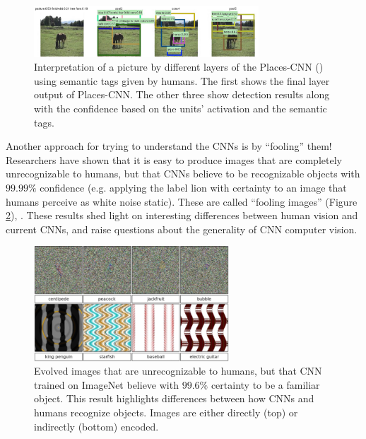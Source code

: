 \begin{figure}[H]
\begin{center}
\includegraphics[width=0.75\textwidth]{fig/cnn_objdet}
\end{center}
\caption{Interpretation of a picture by different layers of the Places-CNN () using semantic tags given by humans. The first shows the final layer output of Places-CNN. The other three show
detection results along with the confidence based on the units’ activation and the semantic tags.}
\label{fig:cnn_objdet}
\end{figure}

Another approach for trying to understand the CNNs is by ``fooling'' them! Researchers have shown that  it is easy to produce images that are
completely unrecognizable to humans, but that CNNs believe to be recognizable objects with $99.99\%$ confidence (e.g. applying the label lion with certainty to an image that humans perceive as white noise static). These are called  “fooling images” (Figure \ref{fig:cnn_fool}), \cite{NguyenYC14}. These results shed light on interesting differences
between human vision and current CNNs, and raise questions about the generality of CNN computer vision.

\begin{figure}[H]
\begin{center}
\includegraphics[width=0.65\textwidth]{fig/cnn_fool}
\end{center}
\caption{Evolved images that are unrecognizable to humans, but that CNN trained on ImageNet believe with
$99.6\%$ certainty to be a familiar object. This result highlights differences between how CNNs and humans recognize objects.
Images are either directly (top) or indirectly (bottom) encoded.}
\label{fig:cnn_fool}
\end{figure}

